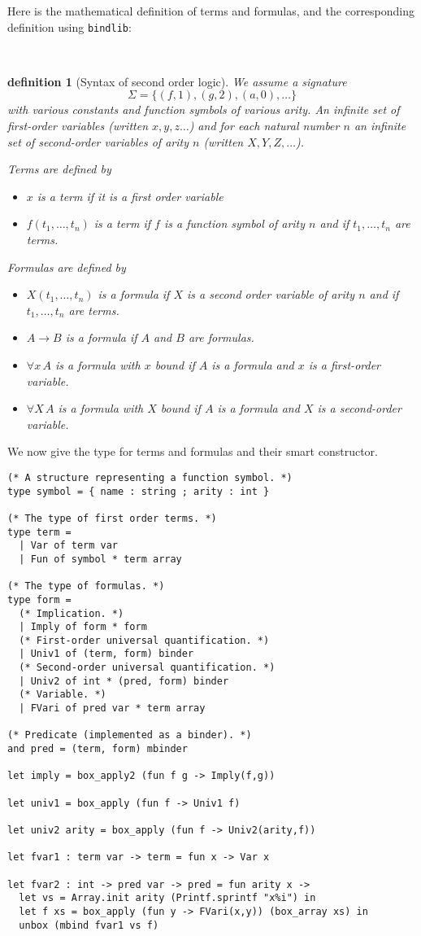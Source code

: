 \documentclass[11pt]{article}
\begin{document}
Here is the mathematical definition of terms and formulas, and the
corresponding definition using \verb#bindlib#:

\newtheorem{definition}{definition}\
\begin{definition}[Syntax of second order logic]\rm
We assume a signature
$$\Sigma = \{(f,1), (g,2), (a,0), \dots\}$$ with various
constants and function symbols of
various arity. An infinite set of first-order variables (written
$x,y,z\dots$) and for each natural number $n$ an infinite set of
second-order variables of arity $n$ (written $X,Y,Z,\dots$).

Terms are defined by
\begin{itemize}
\item $x$ is a term if it is a first order variable
\item $f(t_1,\dots,t_n)$ is a term if $f$ is a function symbol of
arity $n$ and if $t_1,\dots,t_n$ are terms.
\end{itemize}

Formulas are defined by
\begin{itemize}
\item $X(t_1,\dots,t_n)$ is a formula if $X$ is a second order variable of
arity $n$ and if $t_1,\dots,t_n$ are terms.
\item $A \to B$ is a formula if $A$ and $B$ are formulas.
\item $\forall x\,A$ is a formula with $x$ bound if $A$ is a formula
and $x$ is a first-order variable.
\item $\forall X\,A$ is a formula with $X$ bound if $A$ is a formula
and $X$ is a second-order variable.
\end{itemize}
\end{definition}

We now give the type for terms and formulas and their smart constructor.
\begin{verbatim}
(* A structure representing a function symbol. *)
type symbol = { name : string ; arity : int }

(* The type of first order terms. *)
type term =
  | Var of term var
  | Fun of symbol * term array

(* The type of formulas. *)
type form =
  (* Implication. *)
  | Imply of form * form
  (* First-order universal quantification. *)
  | Univ1 of (term, form) binder
  (* Second-order universal quantification. *)
  | Univ2 of int * (pred, form) binder
  (* Variable. *)
  | FVari of pred var * term array

(* Predicate (implemented as a binder). *)
and pred = (term, form) mbinder

let imply = box_apply2 (fun f g -> Imply(f,g))

let univ1 = box_apply (fun f -> Univ1 f)

let univ2 arity = box_apply (fun f -> Univ2(arity,f))

let fvar1 : term var -> term = fun x -> Var x

let fvar2 : int -> pred var -> pred = fun arity x ->
  let vs = Array.init arity (Printf.sprintf "x%i") in
  let f xs = box_apply (fun y -> FVari(x,y)) (box_array xs) in
  unbox (mbind fvar1 vs f)
\end{verbatim}
\end{document}
